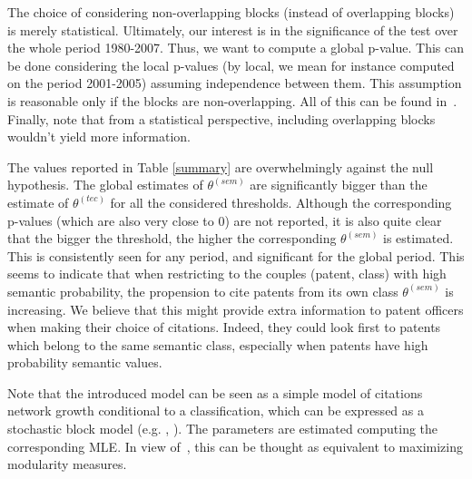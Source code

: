 \documentclass[12pt,twoside,a4paper]{article}
\begin{document}
The choice of considering non-overlapping blocks (instead of overlapping blocks) is merely statistical. Ultimately, our interest is in the significance of the test over the whole period 1980-2007. Thus, we want to compute a global p-value. This can be done considering the local p-values (by local, we mean for instance computed on the period 2001-2005) assuming independence between them. This assumption is reasonable only if the blocks are non-overlapping. All of this can be found in~. Finally, note that from a statistical perspective, including overlapping blocks wouldn't yield more information.

The values reported in Table \ref{summary} are overwhelmingly against the null hypothesis. The global estimates of $\theta^{(sem)}$ are significantly bigger than the estimate of $\theta^{(tec)}$ for all the considered thresholds. Although the corresponding p-values (which are also very close to 0) are not reported, it is also quite clear that the bigger the threshold, the higher the corresponding $\theta^{(sem)}$ is estimated. This is consistently seen for any period, and significant for the global period. This seems to indicate that when restricting to the couples (patent, class) with high semantic probability, the propension to cite patents from its own class $\theta^{(sem)}$ is increasing. We believe that this might provide extra information to patent officers when making their choice of citations. Indeed, they could look first to patents which belong to the same semantic class, especially when patents have high probability semantic values.  

Note that the introduced model can be seen as a simple model of citations network growth conditional to a classification, which can be expressed as a stochastic block model (e.g. \cite{decelle2011asymptotic}, \cite{valles2016multilayer}). The parameters are estimated computing the corresponding MLE. In view of~\cite{2016arXiv160602319N}, this can be thought as equivalent to maximizing modularity measures.
\end{document}
